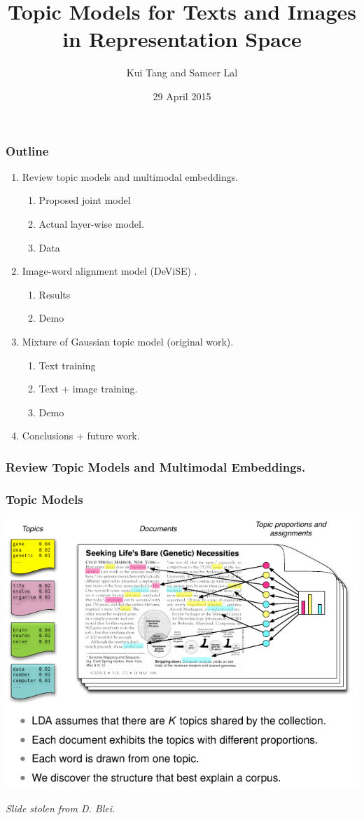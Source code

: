 \documentclass{beamer}
\title{Topic Models for Texts and Images in Representation Space}
\author{Kui Tang and Sameer Lal}
\institute{Columbia University}
\date{29 April 2015}
\begin{document}
\frame{\titlepage}

\begin{frame}
  \frametitle{Outline}
  \begin{enumerate}
    \item Review topic models and multimodal embeddings.
      \begin{enumerate}
        \item Proposed joint model
        \item Actual layer-wise model.
        \item Data
      \end{enumerate}
    \item Image-word alignment model (DeViSE) \citep{Frome13}.
      \begin{enumerate}
        \item Results
        \item Demo
      \end{enumerate}
    \item Mixture of Gaussian topic model (original work).
    \begin{enumerate}
      \item Text training
      \item Text + image training. 
      \item Demo
    \end{enumerate}
    \item Conclusions + future work.
  \end{enumerate}
\end{frame}

\begin{frame}
  \frametitle{Review Topic Models and Multimodal Embeddings.}
\end{frame}

\begin{frame}
  \frametitle{Topic Models}
  {\centering \includegraphics[width=\textwidth]{assets/lda_colors.pdf}}
  {\small \emph{Slide stolen from D. Blei.} \par}
\end{frame}
\end{document}
